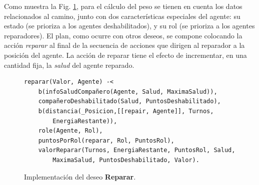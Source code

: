 \documentclass[oneside]{book}
\theoremstyle{definition}
\theoremstyle{example}
\begin{document}
Como muestra la Fig. \ref{fig:deseoReparar}, para el cálculo del peso se tienen en cuenta los datos
relacionados al camino, junto con dos características especiales del agente: su estado (se prioriza 
a los agentes deshabilitados), y su rol (se prioriza a los agentes reparadores). El plan, como 
ocurre con otros deseos, se compone colocando la acción \textit{reparar} al final de la secuencia 
de acciones que dirigen al reparador a la posición del agente. La acción de reparar tiene el efecto 
de incrementar, en una cantidad fija, la \textit{salud} del agente reparado. 

\begin{figure}
\begin{verbatim}
reparar(Valor, Agente) -<
	b(infoSaludCompañero(Agente, Salud, MaximaSalud)),
	compañeroDeshabilitado(Salud, PuntosDeshabilitado),
    b(distancia(_Posicion,[[repair, Agente]], Turnos, 
    	EnergiaRestante)),
    role(Agente, Rol),
	puntosPorRol(reparar, Rol, PuntosRol),
    valorReparar(Turnos, EnergiaRestante, PuntosRol, Salud, 
	    MaximaSalud, PuntosDeshabilitado, Valor).
\end{verbatim}
\caption{Implementación del deseo \textbf{Reparar}.}
\label{fig:deseoReparar}
\end{figure}

%
%


\end{document}
